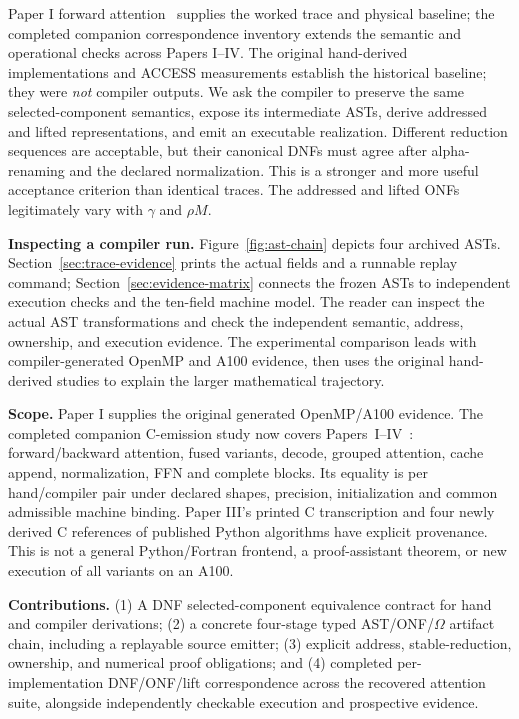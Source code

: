 \documentclass[sigplan,10pt,review,anonymous,balance=false,pbalance=false]{acmart}
\begin{document}
Paper I forward attention~\cite{paperI} supplies the worked trace and physical baseline; the completed companion correspondence inventory extends the semantic and operational checks across Papers I--IV. The original hand-derived implementations and ACCESS measurements establish the historical baseline; they were \emph{not} compiler outputs. We ask the compiler to preserve the same selected-component semantics, expose its intermediate ASTs, derive addressed and lifted representations, and emit an executable realization. Different reduction sequences are acceptable, but their canonical DNFs must agree after alpha-renaming and the declared normalization. This is a stronger and more useful acceptance criterion than identical traces. The addressed and lifted ONFs legitimately vary with $\gamma$ and $\rho M$.

\textbf{Inspecting a compiler run.} Figure~\ref{fig:ast-chain} depicts four archived ASTs. Section~\ref{sec:trace-evidence} prints the actual fields and a runnable replay command; Section~\ref{sec:evidence-matrix} connects the frozen ASTs to independent execution checks and the ten-field machine model. The reader can inspect the actual AST transformations and check the independent semantic, address, ownership, and execution evidence. The experimental comparison leads with compiler-generated OpenMP and A100 evidence, then uses the original hand-derived studies to explain the larger mathematical trajectory.

\textbf{Scope.} Paper I supplies the original generated OpenMP/A100 evidence. The completed companion C-emission study now covers Papers~I--IV~\cite{paperI,paperII,paperIII,paperIV}: forward/backward attention, fused variants, decode, grouped attention, cache append, normalization, FFN and complete blocks. Its equality is per hand/compiler pair under declared shapes, precision, initialization and common admissible machine binding. Paper III's printed C transcription and four newly derived C references of published Python algorithms have explicit provenance. This is not a general Python/Fortran frontend, a proof-assistant theorem, or new execution of all variants on an A100.

\textbf{Contributions.} (1) A DNF selected-component equivalence contract for hand and compiler derivations; (2) a concrete four-stage typed AST/ONF/$\Omega$ artifact chain, including a replayable source emitter; (3) explicit address, stable-reduction, ownership, and numerical proof obligations; and (4) completed per-implementation DNF/ONF/lift correspondence across the recovered attention suite, alongside independently checkable execution and prospective evidence.
\end{document}
